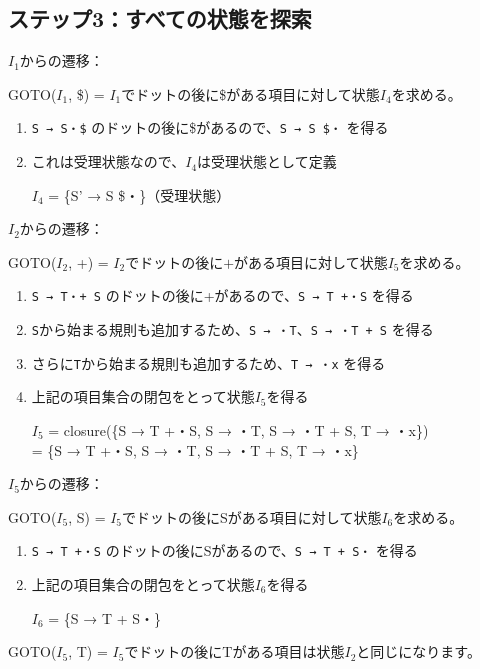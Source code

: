 \subsection{ステップ3：すべての状態を探索}

\(I_1\)からの遷移：

GOTO(\(I_1\), \$) =
\(I_1\)でドットの後に\$がある項目に対して状態\(I_4\)を求める。

\begin{enumerate}
\item
  \texttt{S\textquotesingle{}\ →\ S・\$}
  のドットの後に\$があるので、\texttt{S\textquotesingle{}\ →\ S\ \$・}
  を得る
\item
  これは受理状態なので、\(I_4\)は受理状態として定義

  \(I_4\) = \{S' → S \$・\}（受理状態）
\end{enumerate}

\(I_2\)からの遷移：

GOTO(\(I_2\), +) =
\(I_2\)でドットの後に\(+\)がある項目に対して状態\(I_5\)を求める。

\begin{enumerate}
\item
  \texttt{S\ →\ T・+\ S}
  のドットの後に+があるので、\texttt{S\ →\ T\ +・S} を得る
\item
  \texttt{S}から始まる規則も追加するため、\texttt{S\ →\ ・T}、\texttt{S\ →\ ・T\ +\ S}
  を得る
\item
  さらに\texttt{T}から始まる規則も追加するため、\texttt{T\ →\ ・x}
  を得る
\item
  上記の項目集合の閉包をとって状態\(I_5\)を得る

  \(I_5\) = closure(\{S → T +・S, S → ・T, S → ・T + S, T → ・x\})\\
  = \{S → T +・S, S → ・T, S → ・T + S, T → ・x\}
\end{enumerate}

\(I_5\)からの遷移：

GOTO(\(I_5\), S) =
\(I_5\)でドットの後にSがある項目に対して状態\(I_6\)を求める。

\begin{enumerate}
\item
  \texttt{S\ →\ T\ +・S}
  のドットの後にSがあるので、\texttt{S\ →\ T\ +\ S・} を得る
\item
  上記の項目集合の閉包をとって状態\(I_6\)を得る

  \(I_6\) = \{S → T + S・\}
\end{enumerate}

GOTO(\(I_5\), T) =
\(I_5\)でドットの後にTがある項目は状態\(I_2\)と同じになります。

